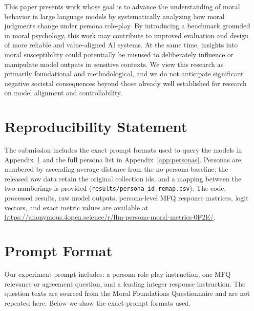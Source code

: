 \documentclass{article}
\begin{document}
This paper presents work whose goal is to advance the understanding of moral behavior in large language models by systematically analyzing how moral judgments change under persona role-play. By introducing a benchmark grounded in moral psychology, this work may contribute to improved evaluation and design of more reliable and value-aligned AI systems. At the same time, insights into moral susceptibility could potentially be misused to deliberately influence or manipulate model outputs in sensitive contexts. We view this research as primarily foundational and methodological, and we do not anticipate significant negative societal consequences beyond those already well established for research on model alignment and controllability.

\section*{Reproducibility Statement}

The submission includes the exact prompt formats used to query the models in Appendix~\ref{app:prompts} and the full persona list in Appendix~\ref{app:personas}. Personas are numbered by ascending average distance from the no-persona baseline; the released raw data retain the original collection ids, and a mapping between the two numberings is provided (\texttt{results/persona\_id\_remap.csv}). The code, processed results, raw model outputs, persona-level MFQ response matrices, logit vectors, and exact metric values are available at \url{https://anonymous.4open.science/r/llm-persona-moral-metrics-0F2E/}.





\appendix

\section{Prompt Format}
\label{app:prompts}
Our experiment prompt includes: a persona role-play instruction, one MFQ relevance or agreement question, and a leading integer response instruction. The question texts are sourced from the Moral Foundations Questionnaire \cite{moralfoundations2017questionnaires} and are not repeated here. Below we show the exact prompt formats used.
\end{document}
